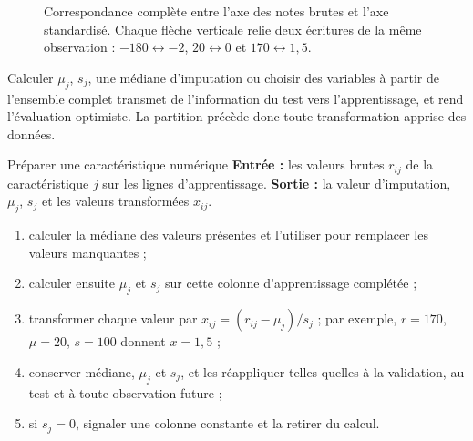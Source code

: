 \begin{figure}[htbp]
\centering
{}
\caption{Correspondance complète entre l'axe des notes brutes et l'axe
standardisé. Chaque flèche verticale relie deux écritures de la même observation :
$-180\leftrightarrow-2$, $20\leftrightarrow0$ et $170\leftrightarrow1{,}5$.}
\label{fig:standardization}
\end{figure}

\begin{vigilance}
Calculer $\mu_j$, $s_j$, une médiane d'imputation ou choisir des variables à
partir de l'ensemble complet transmet de l'information du test vers
l'apprentissage, et rend l'évaluation optimiste. La partition précède donc toute
transformation apprise des données.
\end{vigilance}

\begin{procedure}{Préparer une caractéristique numérique}
\textbf{Entrée :} les valeurs brutes $r_{ij}$ de la caractéristique $j$ sur les
lignes d'apprentissage. \textbf{Sortie :} la valeur d'imputation, $\mu_j$, $s_j$
et les valeurs transformées $x_{ij}$.
\begin{enumerate}
  \item calculer la médiane des valeurs présentes et l'utiliser pour remplacer
        les valeurs manquantes ;
  \item calculer ensuite $\mu_j$ et $s_j$ sur cette colonne d'apprentissage complétée ;
  \item transformer chaque valeur par $x_{ij}=(r_{ij}-\mu_j)/s_j$ ; par exemple,
        $r=170$, $\mu=20$, $s=100$ donnent $x=1{,}5$ ;
  \item conserver médiane, $\mu_j$ et $s_j$, et les réappliquer telles quelles à
        la validation, au test et à toute observation future ;
  \item si $s_j=0$, signaler une colonne constante et la retirer du calcul.
\end{enumerate}
\end{procedure}

